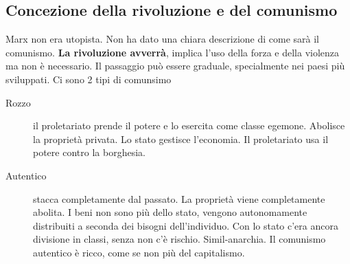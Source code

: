 \subsection{Concezione della rivoluzione e del comunismo}
Marx non era utopista. Non ha dato una chiara descrizione di come sarà il comunismo. \textbf{La
rivoluzione avverrà}, implica l'uso della forza e della violenza ma non è necessario. Il passaggio
può essere graduale, specialmente nei paesi più sviluppati. Ci sono 2 tipi di comunsimo
\begin{description}
  \item[Rozzo] il proletariato prende il potere e lo esercita come classe egemone. Abolisce la
    proprietà privata. Lo stato gestisce l'economia. Il proletariato usa il potere contro la
    borghesia.
  \item[Autentico] stacca completamente dal passato. La proprietà viene completamente abolita. I beni
    non sono più dello stato, vengono autonomamente distribuiti a seconda dei bisogni dell'individuo.
    Con lo stato c'era ancora divisione in classi, senza non c'è rischio. Simil-anarchia. Il
    comunismo autentico è ricco, come se non più del capitalismo.
\end{description}
